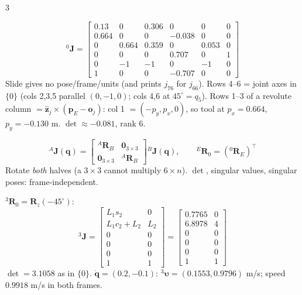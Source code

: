 \begin{multicols}{3}
\begin{worked}[slide 24, assumed nominal pose $\mathbf q=(0,45^\circ,180^\circ,0,45^\circ,0)$, frame $\{0\}$]
\[{}^0\mathbf J=\begin{bmatrix}0.13&0&0.306&0&0&0\\0.664&0&0&-0.038&0&0\\0&0.664&0.359&0&0.053&0\\0&0&0&0.707&0&1\\0&-1&-1&0&-1&0\\1&0&0&-0.707&0&0\end{bmatrix}\]
Slide gives no pose/frame/units (and prints $j_{76}$ for $j_{66}$). Rows 4--6 = joint axes in $\{0\}$ (cols 2,3,5 parallel $(0,-1,0)$; cols 4,6 at $45^\circ=q_5$). Rows 1--3 of a revolute column $=\hat{\mathbf z}_j\times(\mathbf p_E-\mathbf o_j)$: col 1 $=(-p_y,p_x,0)$, so tool at $p_x=0.664$, $p_y=-0.130$ m. $\det\approx-0.081$, rank 6. \chk
\end{worked}

\begin{fbx}
\[{}^A\mathbf J(\mathbf q)=\begin{bmatrix}{}^A\mathbf R_B&\mathbf 0_{3\times3}\\\mathbf 0_{3\times3}&{}^A\mathbf R_B\end{bmatrix}{}^B\mathbf J(\mathbf q),\qquad{}^E\mathbf R_0=({}^0\mathbf R_E)^\top\]
Rotate \emph{both} halves (a $3\times3$ cannot multiply $6\times n$). $\det$, singular values, singular poses: frame-independent.
\end{fbx}
\begin{worked}
${}^3\mathbf R_0=\mathbf R_z(-45^\circ)$:
\[{}^3\mathbf J=\begin{bmatrix}L_1s_2&0\\L_1c_2+L_2&L_2\\0&0\\0&0\\0&0\\1&1\end{bmatrix}=\begin{bmatrix}0.7765&0\\6.8978&4\\0&0\\0&0\\0&0\\1&1\end{bmatrix}\]
$\det=3.1058$ as in $\{0\}$. $\dot{\mathbf q}=(0.2,-0.1)$: ${}^3\boldsymbol\upsilon=(0.1553,0.9796)$ m/s; speed $0.9918$ m/s in both frames. \chk
\end{worked}


\end{multicols}
